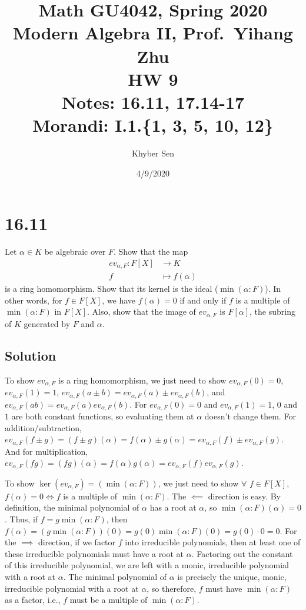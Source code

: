 \documentclass[fleqn]{article}
\title{
Math GU4042, Spring 2020 \\
Modern Algebra II, Prof.\ Yihang Zhu \\
HW 9 \\
Notes: 16.11, 17.14-17 \\
Morandi: I.1.\{1, 3, 5, 10, 12\} \\
}
\author{Khyber Sen}
\date{4/9/2020}
\begin{document}
    
    \maketitle
    
    \section{16.11}
    Let $\alpha \in K$ be algebraic over $F$.  Show that the map
    \begin{align}
        ev_{\alpha, F}: F[X] &\to K \\
        f &\mapsto f(\alpha)
    \end{align}
    is a ring homomorphism.  Show that its kernel is the ideal ($\min(\alpha : F)$).  In other words, for $f \in F[X]$, we have $f(\alpha) = 0$ if and only if $f$ is a multiple of $\min(\alpha : F)$ in $F[X]$.  Also, show that the image of $ev_{\alpha, F}$ is $F[\alpha]$, the subring of $K$ generated by $F$ and $\alpha$.
        
        \subsection{Solution}
        To show $ev_{\alpha, F}$ is a ring homomorphism, we just need to show $ev_{\alpha, F}(0) = 0$, $ev_{\alpha, F}(1) = 1$, $ev_{\alpha, F}(a \pm b) = ev_{\alpha, F}(a) \pm ev_{\alpha, F}(b)$, and $ev_{\alpha, F}(ab) = ev_{\alpha, F}(a) ev_{\alpha, F}(b)$.  For $ev_{\alpha, F}(0) = 0$ and $ev_{\alpha, F}(1) = 1$, $0$ and $1$ are both constant functions, so evaluating them at $\alpha$ doesn't change them.  For addition/subtraction, $ev_{\alpha, F}(f \pm g) = (f \pm g)(\alpha) = f(\alpha) \pm g(\alpha) = ev_{\alpha, F}(f) \pm ev_{\alpha, F}(g)$.  And for multiplication, $ev_{\alpha, F}(fg) = (fg)(\alpha) = f(\alpha) g(\alpha) = ev_{\alpha, F}(f) ev_{\alpha, F}(g)$.
        
        To show $\ker(ev_{\alpha, F}) = (\min(\alpha : F))$, we just need to show $\forall$ $f \in F[X]$, $f(\alpha) = 0 \iff f$ is a multiple of $\min(\alpha : F)$.  The $\impliedby$ direction is easy.  By definition, the minimal polynomial of $\alpha$ has a root at $\alpha$, so $\min(\alpha : F)(\alpha) = 0$.  Thus, if $f = g\min(\alpha : F)$, then $f(\alpha) = (g\min(\alpha : F))(0) = g(0) \min(\alpha : F)(0) = g(0) \cdot 0 = 0$.  For the $\implies$ direction, if we factor $f$ into irreducible polynomials, then at least one of these irreducible polynomials must have a root at $\alpha$.  Factoring out the constant of this irreducible polynomial, we are left with a monic, irreducible polynomial with a root at $\alpha$.  The minimal polynomial of $\alpha$ is precisely the unique, monic, irreducible polynomial with a root at $\alpha$, so therefore, $f$ must have $\min(\alpha : F)$ as a factor, i.e., $f$ must be a multiple of $\min(\alpha : F)$.
        
\end{document}
